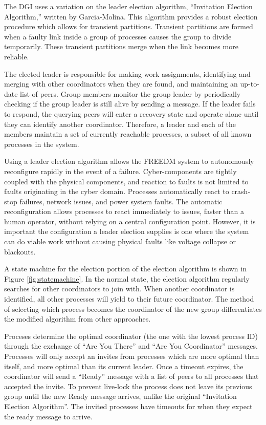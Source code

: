 The DGI uses a variation on the leader election algorithm, ``Invitation Election Algorithm,'' written by Garcia-Molina\cite{INVITATIONELECTION}.
This algorithm provides a robust election procedure which allows for transient partitions.
Transient partitions are formed when a faulty link inside a group of processes causes the group to divide temporarily.
These transient partitions merge when the link becomes more reliable.

The elected leader is responsible for making work assignments, identifying and merging with other coordinators when they are found, and maintaining an up-to-date list of peers.
Group members monitor the group leader by periodically checking if the group leader is still alive by sending a message.
If the leader fails to respond, the querying peers will enter a recovery state and operate alone until they can identify another coordinator.
Therefore, a leader and each of the members maintain a set of currently reachable processes, a subset of all known processes in the system.

Using a leader election algorithm allows the FREEDM system to autonomously reconfigure rapidly in the event of a failure.
Cyber-components are tightly coupled with the physical components, and reaction to faults is not limited to faults originating in the cyber domain.
Processes automatically react to crash-stop failures, network issues, and power system faults.
The automatic reconfiguration allows processes to react immediately to issues, faster than a human operator, without relying on a central configuration point.
However, it is important the configuration a leader election supplies is one where the system can do viable work without causing physical faults like voltage collapse or blackouts\cite{HARINI}.

A state machine for the election portion of the election algorithm is shown in Figure \ref{fig:statemachine}.
In the normal state, the election algorithm regularly searches for other coordinators to join with.
When another coordinator is identified, all other processes will yield to their future coordinator.
The method of selecting which process becomes the coordinator of the new group differentiates the modified algorithm from other approaches.

Proceses determine the optimal coordinator (the one with the lowest process ID) through the exchange of ``Are You There'' and ``Are You Coordinator'' messages.
Processes will only accept an invites from processes which are more optimal than itself, and more optimal than its current leader.
Once a timeout expires, the coordinator will send a ``Ready'' message with a list of peers to all processes that accepted the invite.
To prevent live-lock the process does not leave its previous group until the new Ready message arrives, unlike the original ``Invitation Election Algorithm''.
The invited processes have timeouts for when they expect the ready message to arrive.

